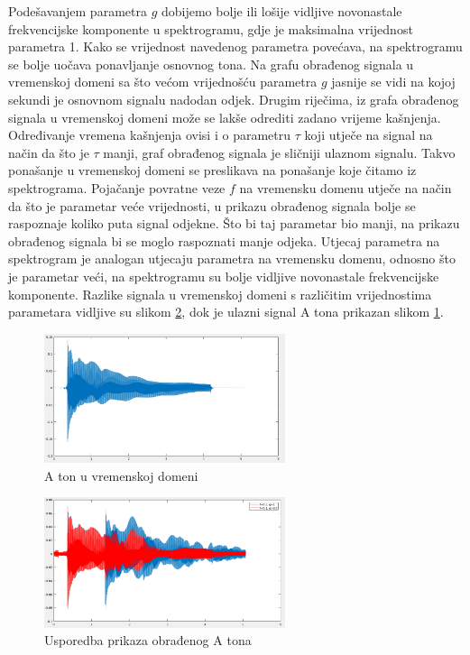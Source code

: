 \documentclass[conference]{IEEEtran}
\begin{document}
Podešavanjem parametra $g$ dobijemo bolje ili lošije vidljive novonastale frekvencijske komponente u
spektrogramu, gdje je maksimalna vrijednost parametra 1. Kako se vrijednost navedenog parametra povećava, na spektrogramu se bolje uočava ponavljanje
osnovnog tona. Na grafu obrađenog signala u vremenskoj domeni sa što većom vrijednošću parametra $g$ jasnije
se vidi na kojoj sekundi je osnovnom signalu nadodan odjek. Drugim riječima, iz grafa obrađenog signala u vremenskoj domeni
može se lakše odrediti zadano vrijeme kašnjenja. Određivanje vremena kašnjenja ovisi i o parametru $\tau$ koji
utječe na signal na način da što je $\tau$ manji, graf obrađenog signala je sličniji ulaznom signalu. Takvo ponašanje
u vremenskoj domeni se preslikava na ponašanje koje čitamo iz spektrograma.
Pojačanje povratne veze $f$ na vremensku domenu utječe na način da što je parametar veće vrijednosti, u prikazu
obrađenog signala bolje se raspoznaje koliko puta signal odjekne. Što bi taj parametar bio manji, na prikazu obrađenog
signala bi se moglo raspoznati manje odjeka. Utjecaj parametra na spektrogram je analogan utjecaju parametra na vremensku
domenu, odnosno što je parametar veći, na spektrogramu su bolje vidljive novonastale frekvencijske komponente.
Razlike signala u vremenskoj domeni s različitim vrijednostima parametara vidljive su slikom \ref{A_usporedba}, dok je
ulazni signal A tona prikazan slikom \ref{A_ton_vrijeme}.

\begin{figure}[H]
  \centerline{\includegraphics[width=200pt]{slike/A_ton_vrijeme.png}}
  \caption{A ton u vremenskoj domeni}
  \label{A_ton_vrijeme}
\end{figure}

\begin{figure}[H]
  \centerline{\includegraphics[width=200pt]{slike/A_ton_usporedba.png}}
  \caption{Usporedba prikaza obrađenog A tona}
  \label{A_usporedba}
\end{figure}
\end{document}
